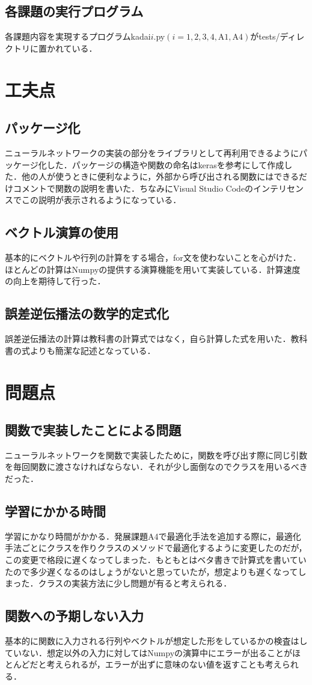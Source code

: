 \documentclass[uplatex]{jsarticle}
\begin{document}
    \subsection{各課題の実行プログラム}
    各課題内容を実現するプログラムkadai$i$.py$(i = 1, 2, 3, 4, \text{A}1, \text{A}4)$がtests/ディレクトリに置かれている．

    \section{工夫点}

    \subsection{パッケージ化}
    ニューラルネットワークの実装の部分をライブラリとして再利用できるようにパッケージ化した．パッケージの構造や関数の命名はkerasを参考にして作成した．他の人が使うときに便利なように，外部から呼び出される関数にはできるだけコメントで関数の説明を書いた．ちなみにVisual Studio Codeのインテリセンスでこの説明が表示されるようになっている．

    \subsection{ベクトル演算の使用}
    基本的にベクトルや行列の計算をする場合，for文を使わないことを心がけた．ほとんどの計算はNumpyの提供する演算機能を用いて実装している．計算速度の向上を期待して行った．

    \subsection{誤差逆伝播法の数学的定式化}
    誤差逆伝播法の計算は教科書の計算式ではなく，自ら計算した式を用いた．教科書の式よりも簡潔な記述となっている．

    \section{問題点}

    \subsection{関数で実装したことによる問題}
    ニューラルネットワークを関数で実装したために，関数を呼び出す際に同じ引数を毎回関数に渡さなければならない．それが少し面倒なのでクラスを用いるべきだった．

    \subsection{学習にかかる時間}
    学習にかなり時間がかかる．発展課題A4で最適化手法を追加する際に，最適化手法ごとにクラスを作りクラスのメソッドで最適化するように変更したのだが，この変更で格段に遅くなってしまった．もともとはベタ書きで計算式を書いていたので多少遅くなるのはしょうがないと思っていたが，想定よりも遅くなってしまった．クラスの実装方法に少し問題が有ると考えられる．

    \subsection{関数への予期しない入力}
    基本的に関数に入力される行列やベクトルが想定した形をしているかの検査はしていない．想定以外の入力に対してはNumpyの演算中にエラーが出ることがほとんどだと考えられるが，エラーが出ずに意味のない値を返すことも考えられる．
\end{document}
